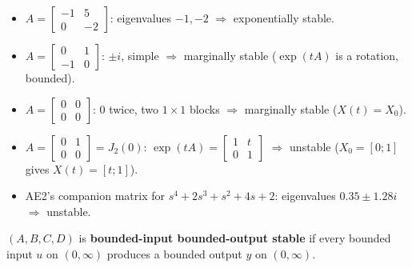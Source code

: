\begin{workbox}[title={Worked examples}]
\begin{itemize}
\item $A=\begin{bmatrix}-1&5\\0&-2\end{bmatrix}$: eigenvalues $-1,-2$ $\Rightarrow$ exponentially stable.
\item $A=\begin{bmatrix}0&1\\-1&0\end{bmatrix}$: $\pm i$, simple $\Rightarrow$ marginally stable ($\exp(tA)$ is a rotation, bounded).
\item $A=\begin{bmatrix}0&0\\0&0\end{bmatrix}$: $0$ twice, two $1\times1$ blocks $\Rightarrow$ marginally stable ($X(t)=X_0$).
\item $A=\begin{bmatrix}0&1\\0&0\end{bmatrix}=J_2(0)$: $\exp(tA)=\begin{bmatrix}1&t\\0&1\end{bmatrix}$ $\Rightarrow$ unstable ($X_0=[0;1]$ gives $X(t)=[t;1]$).
\item AE2's companion matrix for $s^4+2s^3+s^2+4s+2$: eigenvalues $0.35\pm1.28i$ $\Rightarrow$ unstable.
\end{itemize}
\end{workbox}

\begin{defbox}[title={BIBO stability \fr{153}}]
$(A,B,C,D)$ is \textbf{bounded-input bounded-output stable} if every bounded input $u$ on $(0,\infty)$ produces a bounded output $y$ on $(0,\infty)$.
\end{defbox}

